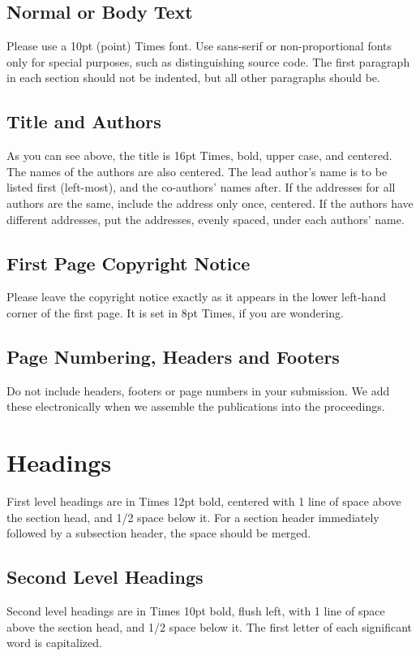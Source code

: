 \documentclass{article}
\begin{document}
\subsection{Normal or Body Text}\label{subsec:body}
Please use a 10pt (point) Times font. 
Use sans-serif or non-proportional fonts
only for special purposes, 
such as distinguishing source code.
The first paragraph in each section should not be indented, 
but all other paragraphs should be.

\subsection{Title and Authors}
As you can see above, the title is 16pt Times, bold, upper case, and centered.
The names of the authors are also centered.
The lead author's name is to be listed first (left-most), and the co-authors' 
names after. If the addresses for all authors are the same, include the 
address only once, centered. If the authors have different addresses, put the 
addresses, evenly spaced, under each authors' name.

\subsection{First Page Copyright Notice}
Please leave the copyright notice exactly as it appears in the lower 
left-hand corner of the first page. It is set in 8pt Times, if you are wondering.

\subsection{Page Numbering, Headers and Footers}
Do not include headers, footers or page numbers in your submission.
We add these electronically when we assemble the publications
into the proceedings.

\section{Headings}
First level headings are in Times 12pt bold,
centered with 1 line of space above the section head, and 1/2 space below it.
For a section header immediately followed by a subsection header, the space 
should be merged.

\subsection{Second Level Headings}
Second level headings are in Times 10pt bold, flush left,
with 1 line of space above the section head, and 1/2 space below it.
The first letter of each significant word is capitalized.
\end{document}
